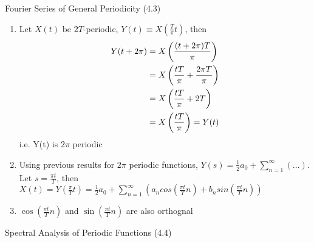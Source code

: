 \documentclass{article}
\begin{document}
\begin{section}{Fourier Series of General Periodicity (4.3)}
\begin{enumerate}
\item Let $X(t)$ be $2T$-periodic, $Y(t) \equiv X(\frac{T}{\pi} t)$, then
  \begin{align}
  Y(t+2\pi) & = X\left(\frac{(t + 2\pi)T}{\pi}\right) \notag\\
   & = X\left(\frac{tT}{\pi} + \frac{2 \pi T}{\pi}\right) \notag\\
   & = X\left(\frac{tT}{\pi} + 2T\right) \notag\\
   & = X\left(\frac{tT}{\pi}\right) = Y(t) \notag
  \end{align} 
  \noindent i.e. Y(t) is $2\pi$ periodic

\item Using previous results for $2\pi$ periodic functions, 
$Y(s) = \frac{1}{2}a_{0} + \sum_{n=1}^{\infty}(\ldots)$. 
Let $s = \frac{\pi t}{T}$, then 
$X(t) = Y(\frac{\pi}{T} t) = \frac{1}{2}a_{0} + \sum_{n=1}^{\infty}
 (a_{n}cos(\frac{\pi t}{T} n) + b_{n}sin(\frac{\pi t}{T} n))$

\item $\cos(\frac{\pi t}{T}n)$ and $\sin(\frac{\pi t}{T}n)$ are also orthognal
\end{enumerate}
\end{section}

\begin{section}{Spectral Analysis of Periodic Functions (4.4)}

\end{section}
\end{document}
